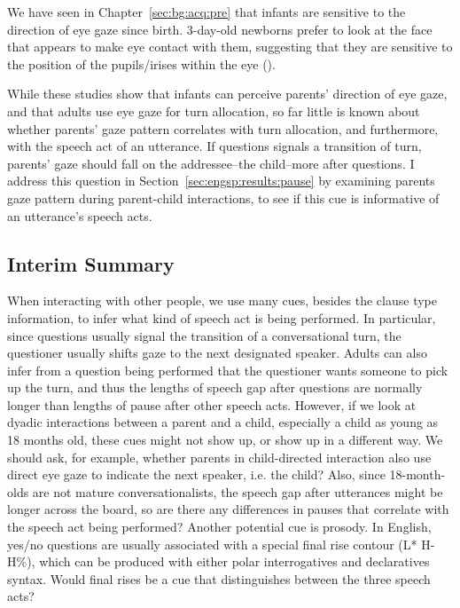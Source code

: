 We have seen in Chapter~\ref{sec:bg:acq:pre} that infants are sensitive to the direction of eye gaze since birth. 3-day-old newborns prefer to look at the face that appears to make eye contact with them, suggesting that they are sensitive to the position of the pupils/irises within the eye (\cite{farroni2004gaze}).


While these studies show that infants can perceive parents' direction of eye gaze, and that adults use eye gaze for turn allocation, so far little is known about whether parents' gaze pattern correlates with turn allocation, and furthermore, with the speech act of an utterance. If questions signals a transition of turn, parents' gaze should fall on the addressee--the child--more after questions. I address this question in Section~\ref{sec:engsp:results:pause} by examining parents gaze pattern during parent-child interactions, to see if this cue is informative of an utterance's speech acts.

\subsection{Interim Summary}
\label{sec:engsp:bg:summary}

When interacting with other people, we use many cues, besides the clause type information, to infer what kind of speech act is being performed. In particular, since questions usually signal the transition of a conversational turn, the questioner usually shifts gaze to the next designated speaker. Adults can also infer from a question being performed that the questioner wants someone to pick up the turn, and thus the lengths of speech gap after questions are normally longer than lengths of pause after other speech acts. However, if we look at dyadic interactions between a parent and a child, especially a child as young as 18 months old, these cues might not show up, or show up in a different way. We should ask, for example, whether parents in child-directed interaction also use direct eye gaze to indicate the next speaker, i.e. the child? Also, since 18-month-olds are not mature conversationalists, the speech gap after utterances might be longer across the board, so are there any differences in pauses that correlate with the speech act being performed? Another potential cue is prosody. In English, yes/no questions are usually associated with a special final rise contour (L* H-H\%), which can be produced with either polar interrogatives and declaratives syntax. Would final rises be a cue that distinguishes between the three speech acts?

